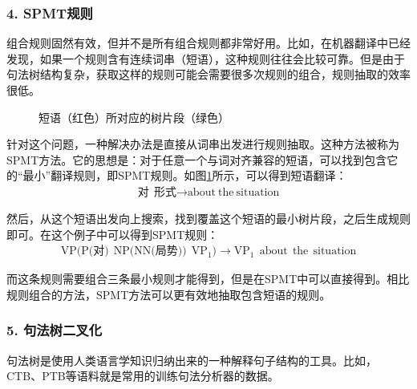 \subsubsection{4. SPMT规则}

\parinterval 组合规则固然有效，但并不是所有组合规则都非常好用。比如，在机器翻译中已经发现，如果一个规则含有连续词串（短语），这种规则往往会比较可靠。但是由于句法树结构复杂，获取这样的规则可能会需要很多次规则的组合，规则抽取的效率很低。

\begin{figure}[htp]
\centering

\caption{短语（红色）所对应的树片段（绿色）}
\label{fig:8-30}
\end{figure}

\parinterval 针对这个问题，一种解决办法是直接从词串出发进行规则抽取。这种方法被称为SPMT方法。它的思想是：对于任意一个与词对齐兼容的短语，可以找到包含它的“最小”翻译规则，即SPMT规则。如图\ref{fig:8-30}所示，可以得到短语翻译：
\begin{eqnarray}
\textrm{对}\ \ \textrm{形式} \rightarrow \textrm{about}\ \textrm{the}\ \textrm{situation} \nonumber
\end{eqnarray}

\parinterval 然后，从这个短语出发向上搜索，找到覆盖这个短语的最小树片段，之后生成规则即可。在这个例子中可以得到SPMT规则：
\begin{eqnarray}
\textrm{VP(P(对)}\ \ \textrm{NP(NN(局势))}\ \ \textrm{VP}_1) \rightarrow \textrm{VP}_1\ \ \textrm{about}\ \ \textrm{the}\ \ \textrm{situation} \nonumber
\end{eqnarray}

\parinterval 而这条规则需要组合三条最小规则才能得到，但是在SPMT中可以直接得到。相比规则组合的方法，SPMT方法可以更有效地抽取包含短语的规则。


\subsubsection{5. 句法树二叉化}

\parinterval 句法树是使用人类语言学知识归纳出来的一种解释句子结构的工具。比如， CTB、PTB等语料就是常用的训练句法分析器的数据。


